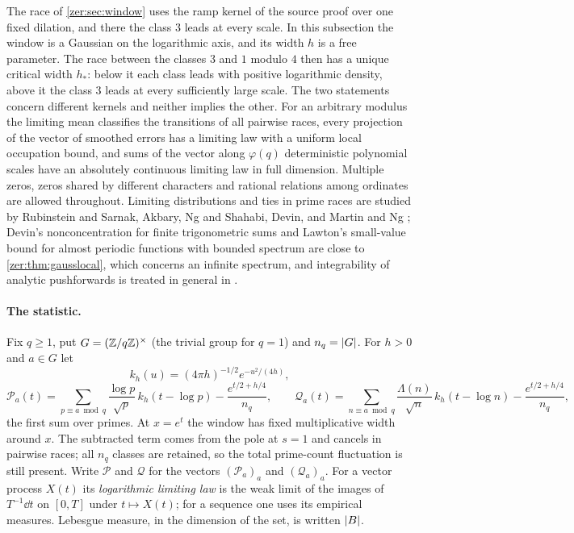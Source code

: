 The race of \cref{zer:sec:window} uses the ramp kernel of the source proof over one fixed
dilation, and there the class $3$ leads at every scale. In this subsection the window is a
Gaussian on the logarithmic axis, and its width $h$ is a free parameter. The race between
the classes $3$ and $1$ modulo $4$ then has a unique critical width $h_*$: below it each
class leads with positive logarithmic density, above it the class $3$ leads at every
sufficiently large scale. The two statements concern different kernels and neither implies
the other. For an arbitrary modulus the limiting mean classifies the transitions of all
pairwise races, every projection of the vector of smoothed errors has a limiting law with a
uniform local occupation bound, and sums of the vector along $\varphi(q)$ deterministic
polynomial scales have an absolutely continuous limiting law in full dimension. Multiple
zeros, zeros shared by different characters and rational relations among ordinates are
allowed throughout. Limiting distributions and ties in prime races are studied by Rubinstein and
Sarnak, Akbary, Ng and Shahabi, Devin, and Martin and Ng
\cite{RubinsteinSarnak1994Chebyshev,AkbaryNgShahabi2014Limiting,Devin2020Limiting,MartinNg2020Inclusive};
Devin's nonconcentration for finite trigonometric sums and Lawton's small-value bound for almost
periodic functions with bounded spectrum \cite{Lawton2019Distribution} are close to
\cref{zer:thm:gausslocal}, which concerns an infinite spectrum, and integrability of analytic
pushforwards is treated in general in \cite{GlazerHendelSodin2022Integrability}.

\paragraph{The statistic.}
Fix $q\ge1$, put $G=(\mathbb{Z}/q\mathbb{Z})^\times$ (the trivial group for $q=1$) and $n_q=\lvert G\rvert$. For
$h>0$ and $a\in G$ let
\[
 k_h(u)=(4\pi h)^{-1/2}e^{-u^2/(4h)},
\]
\begin{equation}\label{zer:eq:gaussPQ}
 \mathcal P_a(t)=\sum_{p\equiv a\bmod q}\frac{\log p}{\sqrt p}\,k_h(t-\log p)-\frac{e^{t/2+h/4}}{n_q},
 \qquad
 \mathcal Q_a(t)=\sum_{n\equiv a\bmod q}\frac{\Lambda(n)}{\sqrt n}\,k_h(t-\log n)-\frac{e^{t/2+h/4}}{n_q},
\end{equation}
the first sum over primes. At $x=e^t$ the window has fixed multiplicative width around $x$.
The subtracted term comes from the pole at $s=1$ and cancels in pairwise races; all $n_q$
classes are retained, so the total prime-count fluctuation is still present. Write $\mathcal P$
and $\mathcal Q$ for the vectors $(\mathcal P_a)_a$ and $(\mathcal Q_a)_a$. For a vector process
$X(t)$ its \emph{logarithmic limiting law} is the weak limit of the images of $T^{-1}\dd t$ on
$[0,T]$ under $t\mapsto X(t)$; for a sequence one uses its empirical measures. Lebesgue measure,
in the dimension of the set, is written $\lvert B\rvert$.


